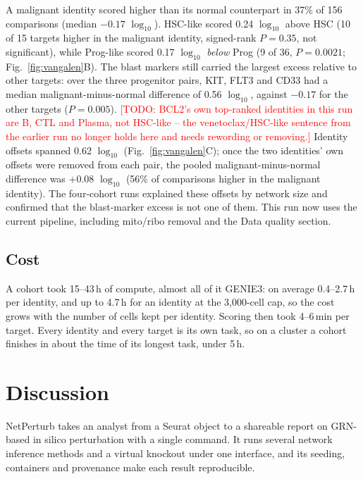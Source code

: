 \documentclass[pdflatex,sn-vancouver-num]{sn-jnl}%
\newcommand{\todo}[1]{\textcolor{red}{[TODO: #1]}}
\begin{document}
A malignant identity scored higher than its normal counterpart in 37\% of 156 comparisons (median $-0.17$ $\log_{10}$). HSC-like scored 0.24 $\log_{10}$ above HSC (10 of 15 targets higher in the malignant identity, signed-rank $P=0.35$, not significant), while Prog-like scored 0.17 $\log_{10}$ \emph{below} Prog (9 of 36, $P=0.0021$; Fig.~\ref{fig:vangalen}B). The blast markers still carried the largest excess relative to other targets: over the three progenitor pairs, KIT, FLT3 and CD33 had a median malignant-minus-normal difference of 0.56 $\log_{10}$, against $-0.17$ for the other targets ($P=0.005$). \todo{BCL2's own top-ranked identities in this run are B, CTL and Plasma, not HSC-like -- the venetoclax/HSC-like sentence from the earlier run no longer holds here and needs rewording or removing.} Identity offsets spanned 0.62 $\log_{10}$ (Fig.~\ref{fig:vangalen}C); once the two identities' own offsets were removed from each pair, the pooled malignant-minus-normal difference was $+0.08$ $\log_{10}$ (56\% of comparisons higher in the malignant identity). The four-cohort runs explained these offsets by network size and confirmed that the blast-marker excess is not one of them. This run now uses the current pipeline, including mito/ribo removal and the Data quality section.

\subsection{Cost}

A cohort took 15--43\,h of compute, almost all of it GENIE3: on average 0.4--2.7\,h per identity, and up to 4.7\,h for an identity at the 3,000-cell cap, so the cost grows with the number of cells kept per identity. Scoring then took 4--6\,min per target. Every identity and every target is its own task, so on a cluster a cohort finishes in about the time of its longest task, under 5\,h.

\section{Discussion}\label{sec:discussion}

NetPerturb takes an analyst from a Seurat object to a shareable report on GRN-based in silico perturbation with a single command. It runs several network inference methods and a virtual knockout under one interface, and its seeding, containers and provenance make each result reproducible.
\end{document}

